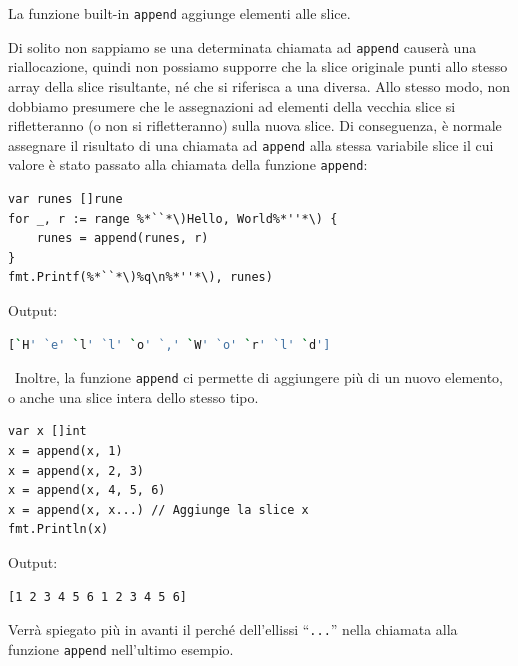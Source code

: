 La funzione built-in \verb|append| aggiunge elementi alle slice.

Di solito non sappiamo se una determinata chiamata ad \verb|append| causerà una riallocazione, quindi non possiamo supporre che la slice originale punti allo stesso array della slice risultante, né che si riferisca a una diversa.
Allo stesso modo, non dobbiamo presumere che le assegnazioni ad elementi della vecchia slice si rifletteranno (o non si rifletteranno) sulla nuova slice.
Di conseguenza, è normale assegnare il risultato di una chiamata ad \verb|append| alla stessa variabile slice il cui valore è stato passato alla chiamata della funzione \verb|append|:
\begin{lstlisting}[frame=single, label={lst:lstlisting3-2.8}]
var runes []rune
for _, r := range %*``*\)Hello, World%*''*\) {
    runes = append(runes, r)
}
fmt.Printf(%*``*\)%q\n%*''*\), runes)
\end{lstlisting}
Output:
\begin{lstlisting}[language=bash, frame=L, label={lst:lstlisting3-2.9}]
[`H' `e' `l' `l' `o' `,' `W' `o' `r' `l' `d']
\end{lstlisting}
\
Inoltre, la funzione \verb|append| ci permette di aggiungere più di un nuovo elemento, o anche una slice intera dello stesso tipo.
\begin{lstlisting}[frame=single, label={lst:lstlisting3-2.10}]
var x []int
x = append(x, 1)
x = append(x, 2, 3)
x = append(x, 4, 5, 6)
x = append(x, x...) // Aggiunge la slice x
fmt.Println(x)
\end{lstlisting}
Output:
\begin{lstlisting}[language=bash, frame=L, label={lst:lstlisting3-2.11}]
[1 2 3 4 5 6 1 2 3 4 5 6]
\end{lstlisting}
Verrà spiegato più in avanti il perché dell'ellissi ``\verb|...|'' nella chiamata alla funzione \verb|append| nell'ultimo esempio.

